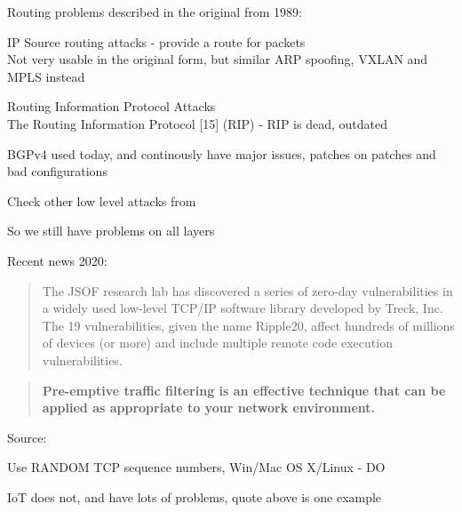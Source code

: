 \documentclass[Screen16to9,17pt]{foils}
\begin{document}
\begin{list1}
\item Routing problems described in the original from 1989:
\begin{list2}
\item IP Source routing attacks - provide a route for packets\\
Not very usable in the original form, but similar ARP spoofing, VXLAN and MPLS instead
\item Routing Information Protocol Attacks\\
The Routing Information Protocol [15] (RIP) - RIP is dead, outdated
\item BGPv4 used today, and continously have major issues, patches on patches and bad configurations
\end{list2}
\vskip 1cm
\item Check other low level attacks from 
\item
\end{list1}


\centerline{\Large So we still have problems on all layers}


Recent news 2020:
\begin{quote}
The JSOF research lab has discovered a series of zero-day vulnerabilities in a widely used low-level TCP/IP software library developed by Treck, Inc. The 19 vulnerabilities, given the name Ripple20, affect hundreds of millions of devices (or more) and include multiple remote code execution vulnerabilities.
\end{quote}

\begin{quote}
{\bf Pre-emptive traffic filtering is an effective technique that can be applied as appropriate to your network environment.}
\end{quote}
Source: 

\begin{list2}
\item Use RANDOM TCP sequence numbers, Win/Mac OS X/Linux - DO
\item IoT does not, and have lots of problems, quote above is one example
\end{list2}

\end{document}
